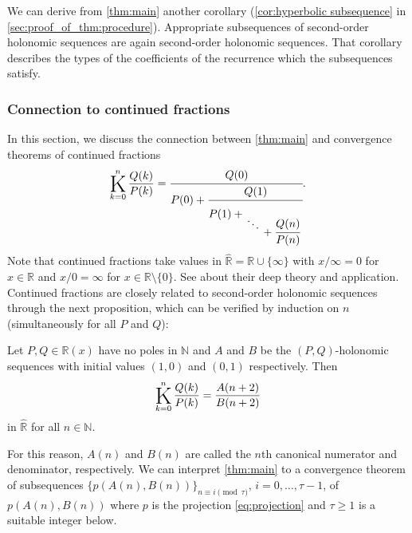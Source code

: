 \documentclass[a4paper,UKenglish,cleveref,autoref,thm-restate]{lipics-v2021}
\newcommand{\R}{\mathbb{R}}
\newcommand{\N}{\mathbb{N}}
\newcommand\Kettenbruch{\operatornamewithlimits{\mathchoice
     {\vcenter{\hbox{\huge $\mathrm{K}$}}}
     {\vcenter{\hbox{\Large $\mathrm{K}$}}}
     {\mathrm{K}}
     {\mathrm{K}}}}
\begin{document}
We can derive from \cref{thm:main} another corollary (\cref{cor:hyperbolic subsequence} in \cref{sec:proof_of_thm:procedure}). Appropriate subsequences of second-order holonomic sequences are again second-order holonomic sequences. That corollary describes the types of the coefficients of the recurrence which the subsequences satisfy. 


\subsubsection{Connection to continued fractions}\label{sec:cfrac}

In this section, we discuss the connection between \cref{thm:main} and convergence theorems of continued fractions
\[
\Kettenbruch _{k=0}^n \frac{Q(k)}{P(k)} 
=
\cfrac{Q(0)}{
P(0) 
+
\cfrac{Q(1)}
{
P(1) + 
\genfrac{}{}{0pt}{0}{\vphantom{l}}{
\lower1ex\hbox{$\ddots$} 
\genfrac{}{}{0pt}{0}{}{
{} + \cfrac{Q(n)}{P(n)}
}
}
}
}.
\]
Note that continued fractions take values in $\hat{\R} = \R \cup \{ \infty \}$ with $x / \infty = 0$ for $x \in \R$ and $x / 0 = \infty$ for $x \in \R \setminus \{ 0 \}$. See \cite{LW08} about their deep theory and application. 
Continued fractions are closely related to second-order holonomic sequences through the next proposition, which can be verified by induction on $n$ (simultaneously for all $P$ and $Q$): 

\begin{proposition}\label{prop:cfrac-holonomic}
Let $P, Q \in \R(x)$ have no poles in $\N$ and $A$ and $B$ be the $(P, Q)$-holonomic sequences with initial values $(1, 0)$ and $(0, 1)$ respectively. Then  
\begin{equation}\label{eq:K=A/B}
\Kettenbruch _{k=0}^n \frac{Q(k)}{P(k)} = \frac{A(n+2)}{B(n+2)}
\end{equation}
in $\hat{\R}$ for all $n \in \N$.
\end{proposition}

For this reason, $A(n)$ and $B(n)$ are called the $n$th canonical numerator and denominator, respectively. We can interpret \cref{thm:main} to a convergence theorem of subsequences $\{ p(A(n), B(n)) \}_{n \equiv i \pmod{\tau}}$, $i=0, \dots, \tau-1$, of $p(A(n), B(n))$ where $p$ is the projection \eqref{eq:projection} and $\tau \geq 1$ is a suitable integer below. 
\end{document}
